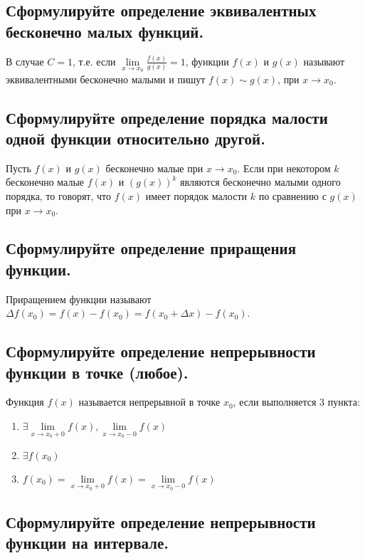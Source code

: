 \documentclass[a4paper, 10pt]{article}
\begin{document}
    \subsection{Сформулируйте определение эквивалентных бесконечно малых функций.}
    
    В случае $C = 1$, т.е. если $\lim\limits_{x \to x_0}\frac{f(x)}{g(x)} = 1$, 
    функции $f(x)$ и $g(x)$ называют эквивалентными бесконечно малыми и пишут $f(x) \sim g(x)$, при $x \to x_0$.

    \subsection{Сформулируйте определение порядка малости одной функции относительно другой.}

    Пусть $f(x)$ и $g(x)$ бесконечно малые при $x \to x_0$. Если при некотором $k$
    бесконечно малые $f(x)$ и $(g(x))^k$ являются бесконечно малыми одного порядка,
    то говорят, что $f(x)$ имеет порядок малости $k$ по сравнению с $g(x)$ при $x \to x_0$.

    \subsection{Сформулируйте определение приращения функции.}

    Приращением функции называют $\Delta f(x_0) = f(x) - f(x_0) = f(x_0 + \Delta x) - f(x_0)$.

    \subsection{Сформулируйте определение непрерывности функции в точке (любое).}

    Функция $f(x)$ называется непрерывной в точке $x_0$, если выполняется 3 пункта:
    \begin{enumerate}
        \item $\exists\lim\limits_{x \to x_0 + 0}f(x),\lim\limits_{x \to x_0 - 0}f(x)$
        \item $\exists f(x_0)$
        \item $f(x_0) = \lim\limits_{x \to x_0 + 0}f(x) = \lim\limits_{x \to x_0 - 0}f(x)$
    \end{enumerate} 

    \subsection{Сформулируйте определение непрерывности функции на интервале.}
\end{document}

